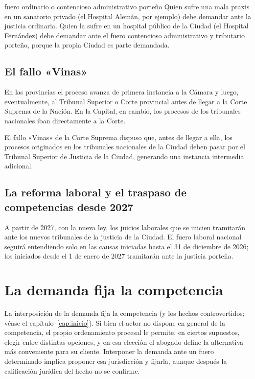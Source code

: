 \documentclass[12pt,oneside]{book}
\begin{document}
\begin{ejemplo}{fuero ordinario o contencioso administrativo porteño}
Quien sufre una mala praxis en un sanatorio privado (el Hospital Alemán, por ejemplo) debe demandar ante la justicia ordinaria. Quien la sufre en un hospital público de la Ciudad (el Hospital Fernández) debe demandar ante el fuero contencioso administrativo y tributario porteño, porque la propia Ciudad es parte demandada.
\end{ejemplo}

\subsection{El fallo «Vinas»}

En las provincias el proceso avanza de primera instancia a la Cámara y luego, eventualmente, al Tribunal Superior o Corte provincial antes de llegar a la Corte Suprema de la Nación. En la Capital, en cambio, los procesos de los tribunales nacionales iban directamente a la Corte.

\begin{importante}
El fallo «Vinas» de la Corte Suprema dispuso que, antes de llegar a ella, los procesos originados en los tribunales nacionales de la Ciudad deben pasar por el Tribunal Superior de Justicia de la Ciudad, generando una instancia intermedia adicional.
\end{importante}

\subsection{La reforma laboral y el traspaso de competencias desde 2027}

A partir de 2027, con la nueva ley, los juicios laborales que se inicien tramitarán ante los nuevos tribunales de la justicia de la Ciudad. El fuero laboral nacional seguirá entendiendo solo en las causas iniciadas hasta el 31 de diciembre de 2026; los iniciados desde el 1 de enero de 2027 tramitarán ante la justicia porteña.

\section{La demanda fija la competencia}\label{sec:fija-competencia}

La interposición de la demanda fija la competencia (y los hechos controvertidos; véase el capítulo~\ref{cap:inicio}). Si bien el actor no dispone en general de la competencia, el propio ordenamiento procesal le permite, en ciertos supuestos, elegir entre distintas opciones, y en esa elección el abogado define la alternativa más conveniente para su cliente. Interponer la demanda ante un fuero determinado implica proponer esa jurisdicción y fijarla, aunque después la calificación jurídica del hecho no se confirme.
\end{document}
